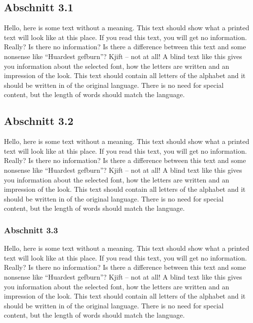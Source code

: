 \subsection{Abschnitt 3.1}\label{Abschnitt31}
Hello, here is some text without a meaning. This text should show what a printed text will look like at this place. If you read this text, you will get no information. Really? Is there no information? Is there a difference between this text and some nonsense like “Huardest gefburn”? Kjift – not at all! A blind text like this gives you information about the selected font, how the letters are written and an impression of the look. This text should contain all letters of the alphabet and it should be written in of the original language. There is no need for special content, but the length of words should match the language.

\subsection{Abschnitt 3.2}\label{Abschnitt32}
Hello, here is some text without a meaning. This text should show what a printed text will look like at this place. If you read this text, you will get no information. Really? Is there no information? Is there a difference between this text and some nonsense like “Huardest gefburn”? Kjift – not at all! A blind text like this gives you information about the selected font, how the letters are written and an impression of the look. This text should contain all letters of the alphabet and it should be written in of the original language. There is no need for special content, but the length of words should match the language.

\subsubsection{Abschnitt 3.3}\label{Abschnitt33}
Hello, here is some text without a meaning. This text should show what a printed text will look like at this place. If you read this text, you will get no information. Really? Is there no information? Is there a difference between this text and some nonsense like “Huardest gefburn”? Kjift – not at all! A blind text like this gives you information about the selected font, how the letters are written and an impression of the look. This text should contain all letters of the alphabet and it should be written in of the original language. There is no need for special content, but the length of words should match the language.

